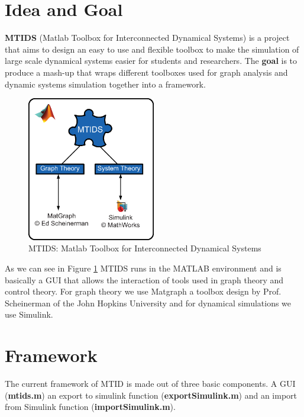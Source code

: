 \documentclass[a4paper,twoside, openright,12pt]{report}
\begin{document}
\section{Idea and Goal}

\textbf{MTIDS} (Matlab Toolbox for Interconnected Dynamical Systems) is a project that aims to design an easy 
to use and flexible toolbox to make the simulation of large scale dynamical systems easier for students and researchers. 
The \textbf{goal} is to produce a mash-up that wraps different toolboxes used for graph analysis and 
dynamic systems simulation together into a framework.  


\begin{figure}[htb]
\centering
\includegraphics[width=0.5\textwidth]{pics/mtidsStructure.eps}
\caption[MTIDS idea]{MTIDS: Matlab Toolbox for Interconnected Dynamical Systems}
\label{mtidsFig}
\end{figure}

As we can see in Figure \ref{mtidsFig} MTIDS runs in the MATLAB environment and is basically a GUI that allows the interaction of tools used in graph theory 
and control theory.  For graph theory we use Matgraph a toolbox design by Prof. Scheinerman of the John Hopkins University and for dynamical simulations
we use Simulink. 

\section{Framework}

The current framework of MTID is made out of three basic components. A GUI (\textbf{mtids.m}) an export to simulink function (\textbf{exportSimulink.m}) and
an import from Simulink function (\textbf{importSimulink.m}).\\

 
\end{document}
